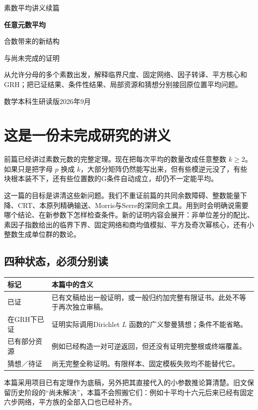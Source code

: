 \documentclass[11pt,a4paper,oneside,openany]{book}
\theoremstyle{definition}\newtheorem{example}[theorem]{例}\newtheorem{conjecture}[theorem]{猜想}
\numberwithin{equation}{chapter}\setcounter{tocdepth}{1}
\begin{document}
\frontmatter
\begin{titlepage}\centering\vspace*{26mm}
{\Large 素数平均讲义续篇\par}\vspace{16mm}
{\Huge\bfseries 任意元数平均\par}\vspace{8mm}
{\LARGE 合数带来的新结构\par}\vspace{5mm}
{\Large 与尚未完成的证明\par}\vfill
\begin{minipage}{.8\textwidth}
从允许分母的多个素数出发，解释临界尺度、固定网络、因子转译、平方核心和GRH；把已证结果、条件性结果、局部资源和猜想分别接回原位置平均问题。
\end{minipage}\vfill
{\large 数学本科生研读版\quad 2026年9月\par}
\end{titlepage}


\chapter*{这是一份未完成研究的讲义}
前篇已经讲过素数元数的完整定理。现在把每次平均的数量改成任意整数 $k\ge2$。如果只是把字母 $p$ 换成 $k$，大部分矩阵仍然能写出来，但有些模逆元没了，有些块根本装不下，还有些位置数的G条件自动成立，却仍不一定能平均。

这一篇的目标是讲清这些新问题。我们不重证前篇的共同余数障碍、整数能量下降、CRT、本原列精确输送、Morris与Serre的深同余工具。用到时会明确说需要哪个结论、在新参数下怎样检查条件。新的证明内容会展开：非单位差分的配比、素因子指数给出的临界下界、固定网络和商均值模拟、平方及奇次幂核心，还有小整数生成单位群的数论。

\section*{四种状态，必须分别读}
\begin{longtable}{p{}p{}}
\toprule 标记&本篇中的含义\\\midrule
已证&已有文稿给出一般证明，或一般归约加完整有限证书。此处不等于再次独立审稿。\\
在GRH下已证&证明实际调用Dirichlet $L$ 函数的广义黎曼猜想；条件不能省略。\\
已有部分资源&例如已经构造一对可逆返回，但还没有证明完整根或终端覆盖。\\
猜想／待证&尚无完整全称证明。有限样本、固定模板失败均不能替代它。\\\bottomrule
\end{longtable}
本篇采用项目已有定理作为底稿，另外把其直接代入的小参数推论算清楚。旧文保留历史阶段的“尚未解决”，本篇不会照搬它们：例如十平均十六元后来已经有固定六步网络，平方族的全部入口也已经补齐。
\end{document}
